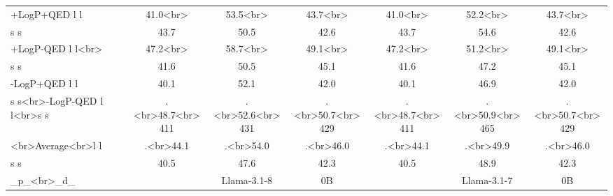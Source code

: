 \begin{table}[t]
\begin{tabular}{lcccccc}
+LogP+QED l l & 41.0<br> & 53.5<br> & 43.7<br> & 41.0<br> & 52.2<br> & 43.7<br> \\
s s & 43.7 & 50.5 & 42.6 & 43.7 & 54.6 & 42.6 \\
+LogP-QED l l<br> & 47.2<br> & 58.7<br> & 49.1<br> & 47.2<br> & 51.2<br> & 49.1<br> \\
s s & 41.6 & 50.5 & 45.1 & 41.6 & 47.2 & 45.1 \\
-LogP+QED l l & 40.1 & 52.1 & 42.0 & 40.1 & 46.9 & 42.0 \\
s s<br>-LogP-QED l l<br>s s & .<br>48.7<br>411 & .<br>52.6<br>431 & .<br>50.7<br>429 & .<br>48.7<br>411 & .<br>50.9<br>465 & .<br>50.7<br>429 \\
<br>Average<br>l l & .<br>44.1 & .<br>54.0 & .<br>46.0 & .<br>44.1 & .<br>49.9 & .<br>46.0 \\
s s & 40.5 & 47.6 & 42.3 & 40.5 & 48.9 & 42.3 \\
_p_<br>_d_ &  & Llama-3.1-8 & 0B &  & Llama-3.1-7 & 0B \\
\bottomrule
\end{tabular}
\end{table}
